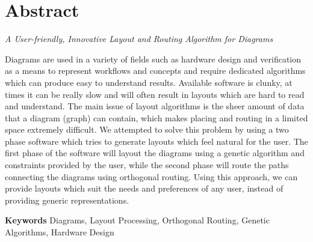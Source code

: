 \chapter*{Abstract}

\emph{A User-friendly, Innovative Layout and Routing Algorithm for Diagrams }

\vspace{\baselineskip}

Diagrams are used in a variety of fields such as hardware design and verification as a means to represent workflows and concepts and require dedicated algorithms which can produce easy to understand results. 
Available software is clunky, at times it can be really slow and will often result in layouts which are hard to read and understand. The main issue of layout algorithms is the sheer amount 
of data that a diagram (graph) can contain, which makes placing and routing in a limited space extremely difficult. We attempted to solve this problem by using a two phase software which tries 
to generate layouts which feel natural for the user. The first phase of the software will layout the diagrams using a genetic algorithm and constraints provided by the user, while the second 
phase will route the paths connecting the diagrams using orthogonal routing. Using this approach, we can provide layouts which suit the needs and preferences of any user, instead of providing 
generic representations.

\vspace{\baselineskip}
\textbf{Keywords} Diagrams, Layout Processing, Orthogonal Routing, Genetic Algorithms, Hardware Design
